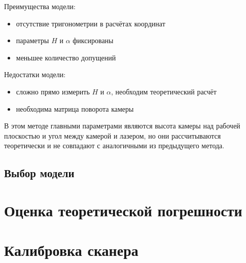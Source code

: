             Преимущества модели:
            \begin{itemize}
                \item отсутствие тригонометрии в расчётах координат
                \item параметры $ H $ и $ \alpha $ фиксированы
                \item меньшее количество допущений
            \end{itemize}
            
            Недостатки модели:
            \begin{itemize}
                \item сложно прямо измерить $ H $ и $ \alpha $, необходим теоретический расчёт
                \item необходима матрица поворота камеры
            \end{itemize}
            
            В этом методе главными параметрами являются высота камеры над рабочей плоскостью и угол между камерой и лазером, но они рассчитываются теоретически и не совпадают с аналогичными из предыдущего метода.
        \subsection{Выбор модели}

    \section{Оценка теоретической погрешности}\label{sec:error}
    
    \section{Калибровка сканера}